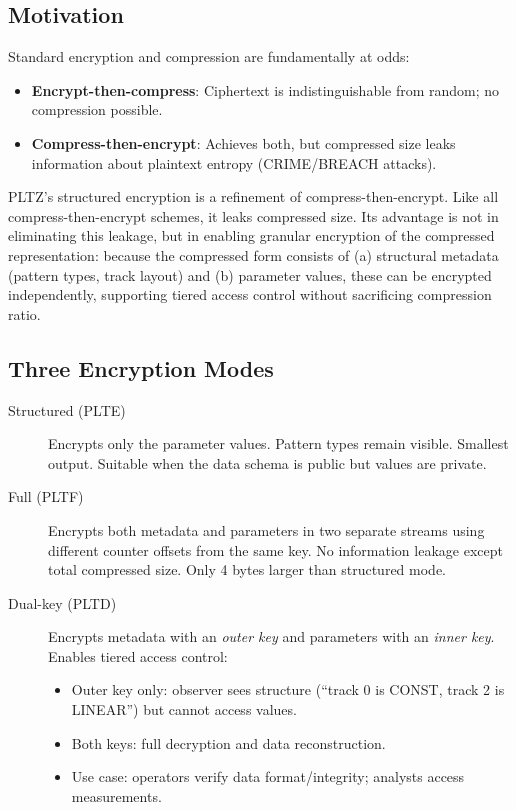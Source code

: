 \documentclass[11pt,a4paper]{article}
\begin{document}
\begin{center}
\end{center}

\subsection{Motivation}

Standard encryption and compression are fundamentally at odds:
\begin{itemize}
\item \textbf{Encrypt-then-compress}: Ciphertext is indistinguishable from random; no compression possible.
\item \textbf{Compress-then-encrypt}: Achieves both, but compressed size leaks information about plaintext entropy (CRIME/BREACH attacks).
\end{itemize}

PLTZ's structured encryption is a refinement of compress-then-encrypt. Like all compress-then-encrypt schemes, it leaks compressed size. Its advantage is not in eliminating this leakage, but in enabling granular encryption of the compressed representation: because the compressed form consists of (a) structural metadata (pattern types, track layout) and (b) parameter values, these can be encrypted independently, supporting tiered access control without sacrificing compression ratio.

\subsection{Three Encryption Modes}

\begin{description}
\item[Structured (PLTE)] Encrypts only the parameter values. Pattern types remain visible. Smallest output. Suitable when the data schema is public but values are private.

\item[Full (PLTF)] Encrypts both metadata and parameters in two separate streams using different counter offsets from the same key. No information leakage except total compressed size. Only 4 bytes larger than structured mode.

\item[Dual-key (PLTD)] Encrypts metadata with an \emph{outer key} and parameters with an \emph{inner key}. Enables tiered access control:
\begin{itemize}
  \item Outer key only: observer sees structure (``track 0 is CONST, track 2 is LINEAR'') but cannot access values.
  \item Both keys: full decryption and data reconstruction.
  \item Use case: operators verify data format/integrity; analysts access measurements.
\end{itemize}
\end{description}
\end{document}
